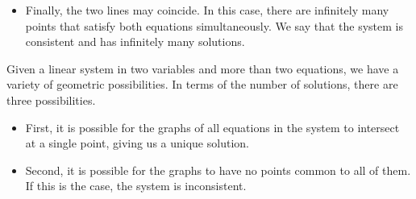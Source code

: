 \documentclass{ximera}
\begin{document}
\begin{exploration}
\begin{itemize}
\begin{center}
\begin{tikzpicture}[scale=.5]
            \end{tikzpicture}
            \end{center}
          \item Finally, the two lines may coincide.  In this case, there are infinitely many points that satisfy both equations simultaneously.  We say that the system is consistent and has infinitely many solutions.
          \begin{center}
          \end{center}
          \end{itemize}
      
                  Given a linear system in two variables and more than two equations, we have a variety of geometric possibilities.  In terms of the number of solutions, there are three possibilities.
       
                  \begin{itemize}
                  \item First, it is possible for the graphs of all equations in the system to intersect at a single point, giving us a unique solution. 
                   
                  \begin{center}
                  \end{center}
                   
                  \item Second, it is possible for the graphs to have no points common to all of them.  If this is the case, the system is inconsistent.
                   

\end{itemize}
\end{exploration}
\end{document}
